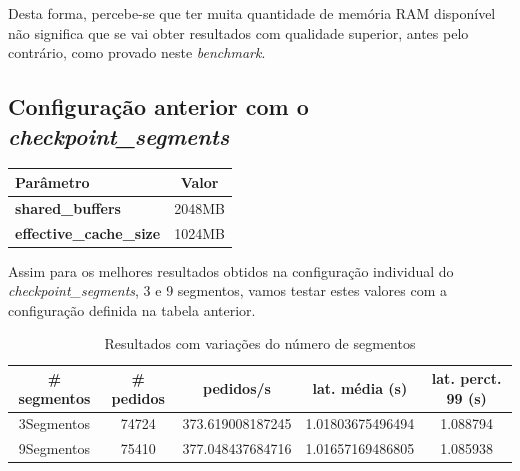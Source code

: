 Desta forma, percebe-se que ter muita quantidade de memória RAM disponível não significa que se vai obter resultados com qualidade superior, antes pelo contrário, como provado neste \textit{benchmark}.

\subsection{Configuração anterior com o \textit{checkpoint\_segments}}

\begin{table}[!h]
\center
\small
\begin{tabular}{|l|c|}
\hline
\textbf{Parâmetro} & \textbf{Valor} \\ \hline
\textbf{shared\_buffers} & 2048MB  \\ \hline
\textbf{effective\_cache\_size} & 1024MB  \\ \hline
\end{tabular}
\end{table}

Assim para os melhores resultados obtidos na configuração individual do \textit{checkpoint\_segments}, 3 e 9 segmentos, vamos testar estes valores com a configuração definida na tabela anterior.

\begin{table}[!h]
\center
\small
\begin{tabular}{|c|c|c|c|c|}
\hline
\textbf{\# segmentos} & \textbf{\# pedidos} & \textbf{pedidos/s} & \textbf{lat. média (s)} & \textbf{lat. perct. 99 (s)}  \\ \hline
3Segmentos & 74724 & 373.619008187245 & 1.01803675496494 & 1.088794  \\ \hline
9Segmentos & 75410 & 377.048437684716 & 1.01657169486805 & 1.085938  \\ \hline
\end{tabular}
\caption{Resultados com variações do número de segmentos}
\end{table}

